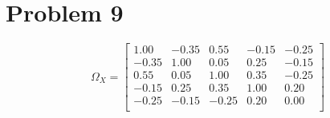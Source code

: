 \documentclass{article}
\begin{document}
\section*{Problem 9}
\begin{equation*}
\Omega_X =
\begin{bmatrix}{}
  1.00 & -0.35 & 0.55 & -0.15 & -0.25 \\ 
  -0.35 & 1.00 & 0.05 & 0.25 & -0.15 \\ 
  0.55 & 0.05 & 1.00 & 0.35 & -0.25 \\ 
  -0.15 & 0.25 & 0.35 & 1.00 & 0.20 \\ 
  -0.25 & -0.15 & -0.25 & 0.20 & 0.00 \\ 
  \end{bmatrix}
\end{equation*}
\end{document}
